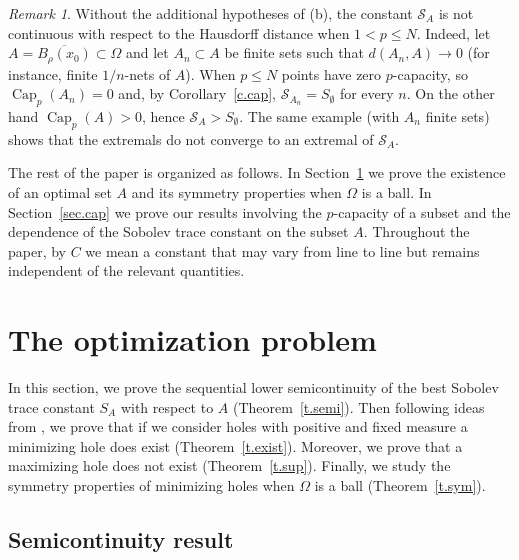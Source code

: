 \documentclass[11pt]{amsart}
\theoremstyle{remark}
\newtheorem{remark}{Remark}[section]
\numberwithin{equation}{section}
\newcommand{\cS}{\mathcal{S}}
\DeclareMathOperator{\capa}{Cap}
\begin{document}
\begin{remark}\label{r.counter}
Without the additional hypotheses of (b), the constant $\cS_A$ is not continuous with respect to the Hausdorff distance when $1<p\le N$. Indeed, let $A=\overline{B_\rho(x_0)}\subset\Omega$ and let $A_n\subset A$ be finite sets such that $d(A_n,A)\to0$ (for instance, finite $1/n$-nets of $A$). When $p\le N$ points have zero $p$-capacity, so $\capa_p(A_n)=0$ and, by Corollary~\ref{c.cap}, $\cS_{A_n}=S_\emptyset$ for every $n$. On the other hand $\capa_p(A)>0$, hence $\cS_A>S_\emptyset$. The same example (with $A_n$ finite sets) shows that the extremals do not converge to an extremal of $\cS_A$.
\end{remark}

The rest of the paper is organized as follows. In Section~\ref{sec.opt} we prove the existence of an optimal set $A$ and its symmetry properties when $\Omega$ is a ball. In Section~\ref{sec.cap} we prove our results involving the $p$-capacity of a subset and the dependence of the Sobolev trace constant on the subset $A$. Throughout the paper, by $C$ we mean a constant that may vary from line to line but remains independent of the relevant quantities.

\section{The optimization problem}\label{sec.opt}

In this section, we prove the sequential lower semicontinuity of the best Sobolev trace constant $S_A$ with respect to $A$ (Theorem~\ref{t.semi}). Then following ideas from \cite{De}, we prove that if we consider holes with positive and fixed measure a minimizing hole does exist (Theorem~\ref{t.exist}). Moreover, we prove that a maximizing hole does not exist (Theorem~\ref{t.sup}). Finally, we study the symmetry properties of minimizing holes when $\Omega$ is a ball (Theorem~\ref{t.sym}).

\subsection{Semicontinuity result}
\end{document}
